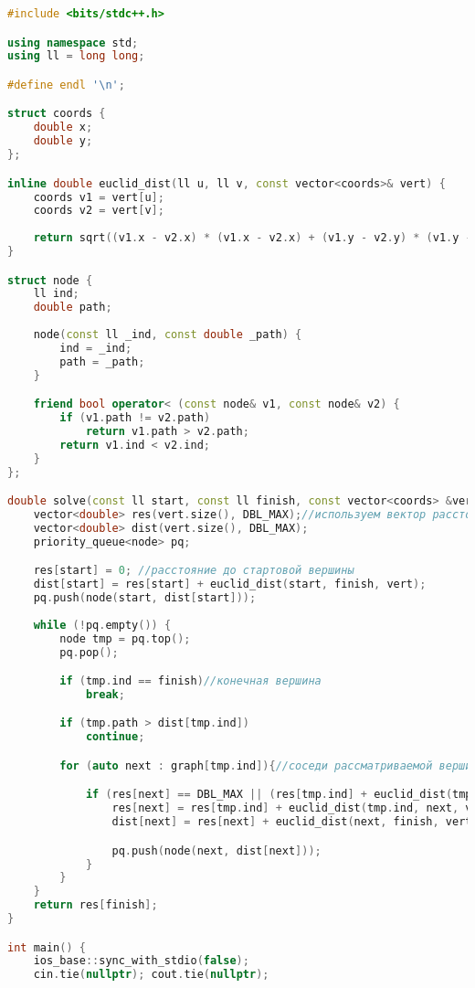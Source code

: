 \begin{lstlisting}[language=C++]
#include <bits/stdc++.h>

using namespace std;
using ll = long long; 

#define endl '\n';

struct coords {
    double x;
    double y;
};

inline double euclid_dist(ll u, ll v, const vector<coords>& vert) {
    coords v1 = vert[u];
    coords v2 = vert[v];
    
    return sqrt((v1.x - v2.x) * (v1.x - v2.x) + (v1.y - v2.y) * (v1.y - v2.y));
}

struct node {
    ll ind;
    double path;
    
    node(const ll _ind, const double _path) {
        ind = _ind;
        path = _path;
    }

    friend bool operator< (const node& v1, const node& v2) {
        if (v1.path != v2.path)
            return v1.path > v2.path;
        return v1.ind < v2.ind;
    }
};

double solve(const ll start, const ll finish, const vector<coords> &vert, const vector<vector<ll>> &graph) {
    vector<double> res(vert.size(), DBL_MAX);//используем вектор расстояний в том числе, как вектор посещенных вершин
    vector<double> dist(vert.size(), DBL_MAX);
    priority_queue<node> pq;

    res[start] = 0; //расстояние до стартовой вершины
    dist[start] = res[start] + euclid_dist(start, finish, vert);
    pq.push(node(start, dist[start]));
    
    while (!pq.empty()) {
        node tmp = pq.top();
        pq.pop();

        if (tmp.ind == finish)//конечная вершина
            break;

        if (tmp.path > dist[tmp.ind])
            continue;

        for (auto next : graph[tmp.ind]){//соседи рассматриваемой вершины

            if (res[next] == DBL_MAX || (res[tmp.ind] + euclid_dist(tmp.ind, next, vert)) < res[next]){
                res[next] = res[tmp.ind] + euclid_dist(tmp.ind, next, vert);
                dist[next] = res[next] + euclid_dist(next, finish, vert);

                pq.push(node(next, dist[next]));
            }
        }
    }
    return res[finish];
}

int main() {
    ios_base::sync_with_stdio(false);
    cin.tie(nullptr); cout.tie(nullptr);


\end{lstlisting}

